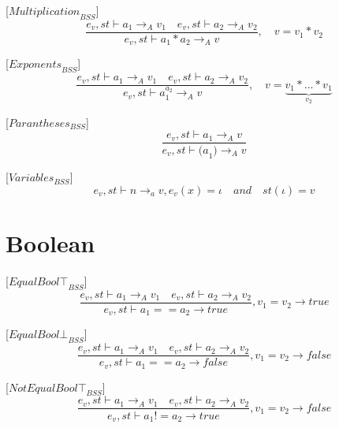 [${Multiplication}_{BSS}$]
\begin{equation}
	\frac { { e }_{ v },st\vdash { a }_{ 1 }{ \rightarrow  }_{ A }{ v }_{ 1 }\quad { e }_{ v },st\vdash { a }_{ 2 }{ \rightarrow  }_{ A }{ v }_{ 2 } }{ { e }_{ v },st\vdash { a }_{ 1 }\ast { a }_{ 2 }{ \rightarrow  }_{ A }{ v } } ,\quad v={ v }_{ 1 }\ast { v }_{ 2 }
\end{equation}

[${Exponents}_{BSS}$]
\begin{equation}
	\frac { { e }_{ v },st\vdash { a }_{ 1 }{ \rightarrow  }_{ A }{ v }_{ 1 }\quad { e }_{ v },st\vdash { a }_{ 2 }{ \rightarrow  }_{ A }{ v }_{ 2 } }{ { e }_{ v },st\vdash { a }_{ 1 }^{ { a }_{ 2 } }{ \rightarrow  }_{ A }{ v } } ,\quad v=\underset { { v }_{ 2 } }{ \underbrace { v_{ 1 }*\dots *v_{ 1 } }  }
\end{equation}

[${Parantheses}_{BSS}$]
\begin{equation}
	\frac { { e }_{ v },st\vdash { a }_{ 1 }{ \rightarrow  }_{ A }{ v } }{ { e }_{ v },st\vdash { (a }_{ 1 }){ \rightarrow  }_{ A }{ v } }
\end{equation}


[${Variables}_{BSS}$]
\begin{equation}
	{ e }_{ v },st\vdash n{ \rightarrow  }_{ a }v, { e }_{ v }(x)=\iota\quad and\quad st(\iota )=v
\end{equation}

\section*{Boolean}
[${EqualBool\top}_{BSS}$]
\begin{equation}
	\frac { { e }_{ v },st\vdash { a }_{ 1 }{ \rightarrow  }_{ A }{ v }_{ 1 }\quad { e }_{ v },st\vdash { a }_{ 2 }{ \rightarrow  }_{ A }{ v }_{ 2 } }{ { e }_{ v },st\vdash { a }_{ 1 }=={ a }_{ 2 }{ \rightarrow  }true } ,{ v }_{ 1 }={ v }_{ 2 }\rightarrow true
\end{equation}

[${EqualBool\bot}_{BSS}$]
\begin{equation}
	\frac { { e }_{ v },st\vdash { a }_{ 1 }{ \rightarrow  }_{ A }{ v }_{ 1 }\quad { e }_{ v },st\vdash { a }_{ 2 }{ \rightarrow  }_{ A }{ v }_{ 2 } }{ { e }_{ v },st\vdash { a }_{ 1 }=={ a }_{ 2 }{ \rightarrow  }false } ,{ v }_{ 1 }={ v }_{ 2 }\rightarrow false
\end{equation}

[${NotEqualBool\top}_{BSS}$]
\begin{equation}
	\frac { { e }_{ v },st\vdash { a }_{ 1 }{ \rightarrow  }_{ A }{ v }_{ 1 }\quad { e }_{ v },st\vdash { a }_{ 2 }{ \rightarrow  }_{ A }{ v }_{ 2 } }{ { e }_{ v },st\vdash { a }_{ 1 }!={ a }_{ 2 }{ \rightarrow  }true } ,{ v }_{ 1 }={ v }_{ 2 }\rightarrow false
\end{equation}

